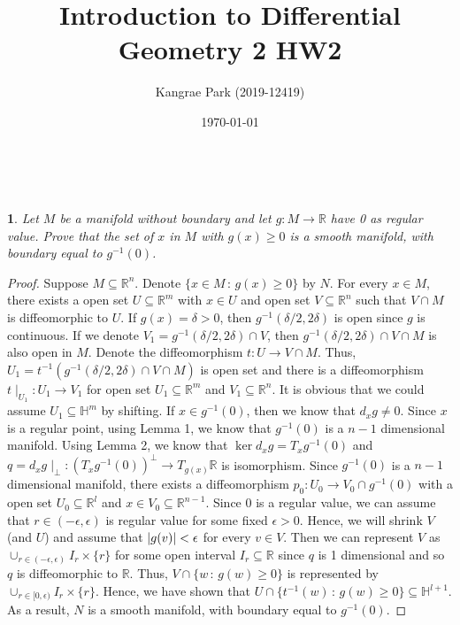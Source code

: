 \documentclass[11pt, twoside, a4paper]{article}
\theoremstyle{prob}
\newtheorem{problem}{}
\newcommand{\mb}{\mathbb}
\begin{document}
\title{Introduction to Differential Geometry 2 HW2}
\author{Kangrae Park (2019-12419)}
\date{\today}
\maketitle
\setlength{\parindent}{0mm}%
​\setlength{\parskip}{0mm}%
\setlength{\belowdisplayskip}{5pt} \setlength{\belowdisplayshortskip}{2pt}
\setlength{\abovedisplayskip}{5pt} \setlength{\abovedisplayshortskip}{2pt}

\begin{problem}
    Let $M$ be a manifold without boundary and let $g: M\to\mb{R}$ have 0 as regular value. Prove that the set of $x$ in $M$ with $g(x)\geq 0$ is a smooth manifold, with boundary equal to $g^{-1}(0)$.
\end{problem}    

\begin{proof}
    Suppose $M\subseteq \mb{R}^n$. Denote $\{x\in M \, :\, g(x)\geq 0 \}$ by $N$. For every $x\in M$, there exists a open set $U\subseteq \mb{R}^m$ with $x\in U$ and open set $V\subseteq \mb{R}^n$ such that $V\cap M$ is diffeomorphic to $U$. If $g(x)=\delta>0$, then $g^{-1}(\delta/2, 2\delta)$ is open since $g$ is continuous. If we denote $V_1=g^{-1}(\delta/2, 2\delta)\cap V$, then $g^{-1}(\delta/2, 2\delta)\cap V\cap M$ is also open in $M$. Denote the diffeomorphism $t: U\to V\cap M$. Thus, $U_1=t^{-1}(g^{-1}(\delta/2, 2\delta)\cap V\cap M)$ is open set and there is a diffeomorphism $t\mid_{U_1}: U_1 \to V_1$ for open set $U_1\subseteq \mb{R}^m$ and $V_1\subseteq \mb{R}^n$. It is obvious that we could assume $U_1\subseteq \mb{H}^m$ by shifting. If $x\in g^{-1}(0)$, then we know that $d_x g \neq 0$. Since $x$ is a regular point, using Lemma 1, we know that $g^{-1}(0)$ is a $n-1$ dimensional manifold. Using Lemma 2, we know that $\ker d_x g=T_x g^{-1}(0)$ and $q=d_x g\mid_{\perp}: (T_x g^{-1}(0))^{\perp}\to T_{g(x)}\mb{R}$ is isomorphism. Since $g^{-1}(0)$ is a $n-1$ dimensional manifold, there exists a diffeomorphism $p_0: U_0\to V_0\cap g^{-1}(0)$ with a open set $U_0\subseteq \mb{R}^l$ and $x\in V_0 \subseteq \mb{R}^{n-1}$. Since $0$ is a regular value, we can assume that $r\in (-\epsilon, \epsilon)$ is regular value for some fixed $\epsilon>0$. Hence, we will shrink $V$ (and $U$) and assume that $\abs{g(v)}<\epsilon$ for every $v\in V$. Then we can represent $V$ as $\cup_{r\in (-\epsilon, \epsilon)} I_r\times \{r\}$ for some open interval $I_r\subseteq \mb{R}$ since $q$ is 1 dimensional and so $q$ is diffeomorphic to $\mb{R}$. Thus, $V\cap \{w\, : \,g(w)\geq 0 \}$ is represented by $\cup_{r\in [0, \epsilon)}  I_r\times \{r\}$. Hence, we have shown that $U\cap \{t^{-1}(w)\, : \, g(w)\geq 0\}\subseteq \mb{H}^{l+1}$. As a result, $N$ is a smooth manifold, with boundary equal to $g^{-1}(0)$.
\end{proof}
\end{document}
